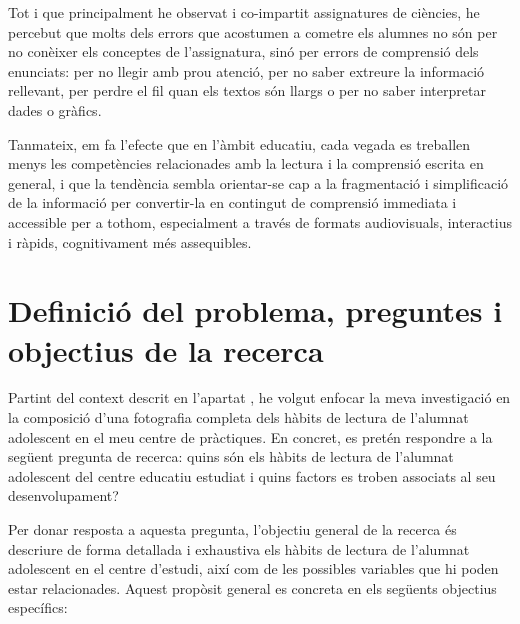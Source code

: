 \documentclass[12pt]{article}
\begin{document}
Tot i que principalment he observat i co-impartit assignatures de ciències, he percebut que molts dels errors que acostumen a cometre els alumnes no són per no conèixer els conceptes de l'assignatura, sinó per errors de comprensió dels enunciats: per no llegir amb prou atenció, per no saber extreure la informació rellevant, per perdre el fil quan els textos són llargs o per no saber interpretar dades o gràfics.

Tanmateix, em fa l'efecte que en l'àmbit educatiu, cada vegada es treballen menys les competències relacionades amb la lectura i la comprensió escrita en general, i que la tendència sembla orientar-se cap a la fragmentació i simplificació de la informació per convertir-la en contingut de comprensió immediata i accessible per a tothom, especialment a través de formats audiovisuals, interactius i ràpids, cognitivament més assequibles.

\newpage
\section{Definició del problema, preguntes i objectius de la recerca}
Partint del context descrit en l'apartat , he volgut enfocar la meva investigació en la composició d'una fotografia completa dels hàbits de lectura de l'alumnat adolescent en el meu centre de pràctiques. En concret, es pretén respondre a la següent pregunta de recerca: quins són els hàbits de lectura de l’alumnat adolescent del centre educatiu estudiat i quins factors es troben associats al seu desenvolupament?

Per donar resposta a aquesta pregunta, l’objectiu general de la recerca és descriure de forma detallada i exhaustiva els hàbits de lectura de l’alumnat adolescent en el centre d'estudi, així com de les possibles variables que hi poden estar relacionades. Aquest propòsit general es concreta en els següents objectius específics:
\end{document}
